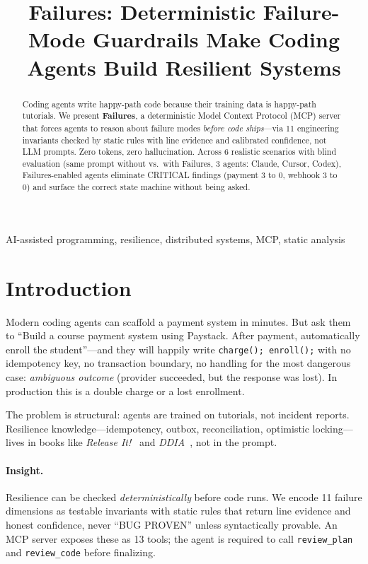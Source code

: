 \documentclass[conference]{IEEEtran}
\title{Failures: Deterministic Failure-Mode Guardrails Make Coding Agents Build Resilient Systems}
\author{\IEEEauthorblockN{Mayowa Kalejaiye}\IEEEauthorblockA{Failures MCP Project\ \texttt{github.com/mayowa-kalejaiye/Failures}}}
\begin{document}
\maketitle
\begin{abstract}
Coding agents write happy-path code because their training data is happy-path tutorials. We present \textbf{Failures}, a deterministic Model Context Protocol (MCP) server that forces agents to reason about failure modes \emph{before code ships}---via 11 engineering invariants checked by static rules with line evidence and calibrated confidence, not LLM prompts. Zero tokens, zero hallucination. Across 6 realistic scenarios with blind evaluation (same prompt without vs.\ with Failures, 3 agents: Claude, Cursor, Codex), Failures-enabled agents eliminate CRITICAL findings (payment 3 to 0, webhook 3 to 0) and surface the correct state machine without being asked.
\end{abstract}
\begin{IEEEkeywords}AI-assisted programming, resilience, distributed systems, MCP, static analysis\end{IEEEkeywords}
\section{Introduction}
Modern coding agents can scaffold a payment system in minutes. But ask them to ``Build a course payment system using Paystack. After payment, automatically enroll the student''---and they will happily write \texttt{charge(); enroll();} with no idempotency key, no transaction boundary, no handling for the most dangerous case: \emph{ambiguous outcome} (provider succeeded, but the response was lost). In production this is a double charge or a lost enrollment.

The problem is structural: agents are trained on tutorials, not incident reports. Resilience knowledge---idempotency, outbox, reconciliation, optimistic locking---lives in books like \emph{Release It!}~\cite{releaseit} and \emph{DDIA}~\cite{ddia}, not in the prompt.

\paragraph{Insight.} Resilience can be checked \emph{deterministically} before code runs. We encode 11 failure dimensions as testable invariants with static rules that return line evidence and honest confidence, never ``BUG PROVEN'' unless syntactically provable. An MCP server exposes these as 13 tools; the agent is required to call \texttt{review\_plan} and \texttt{review\_code} before finalizing.
\end{document}
